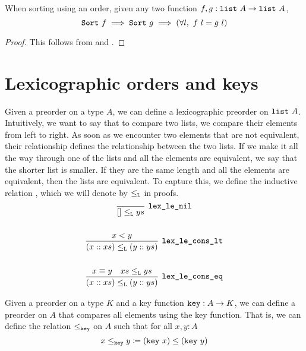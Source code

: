 \documentclass[sigplan,10pt,anonymous,review]{thesis}
\begin{document}
\begin{theorem}
  \label{thm:sort_ord_unique}
  When sorting using an order, given any two function $f, g:
  \texttt{\textup{list}}~A \to \texttt{\textup{list}}~A$,
  \begin{equation*}
    \texttt{\textup{Sort}}~f \implies \texttt{\textup{Sort}}~g \implies
    (\forall l,~f~l = g~l)
  \end{equation*}
\end{theorem}
\begin{proof}
  This follows from  and .
\end{proof}

\section{Lexicographic orders and keys}
\label{sec:lex_ord}

Given a preorder on a type $A$, we can define a lexicographic preorder
on $\texttt{\textup{list}}~A$. Intuitively, we want to say that to compare two
lists, we compare their elements from left to right. As soon as we
encounter two elements that are not equivalent, their relationship
defines the relationship between the two lists. If we make it all the
way through one of the lists and all the elements are equivalent, we
say that the shorter list is smaller. If they are the same length and
all the elements are equivalent, then the lists are equivalent. To
capture this, we define the inductive relation , which we
will denote by $\le_{\texttt{\textup{L}}}$ in proofs.
\begin{gather*}
  \infer[\var{lex\_le\_nil}]{[] \lexle ys}{}
  \\
  \\
  \infer[\var{lex\_le\_cons\_lt}]{(x :: xs) \lexle (y :: ys)}{%
    x < y
  }
  \\
  \\
  \infer[\var{lex\_le\_cons\_eq}]{(x :: xs) \lexle (y :: ys)}{%
    x \equiv y & xs \lexle ys
  }
\end{gather*}

Given a preorder on a type $K$ and a key function $\texttt{\textup{key}} : A \to K$,
we can define a preorder on $A$ that compares all elements using the
key function. That is, we can define the relation $\le_{\texttt{\textup{key}}}$ on
$A$ such that for all $x, y : A$
\begin{equation*}
  x \le_{\texttt{\textup{key}}} y \coloneqq (\texttt{\textup{key}}~x) \le (\texttt{\textup{key}}~y)
\end{equation*}
\end{document}
